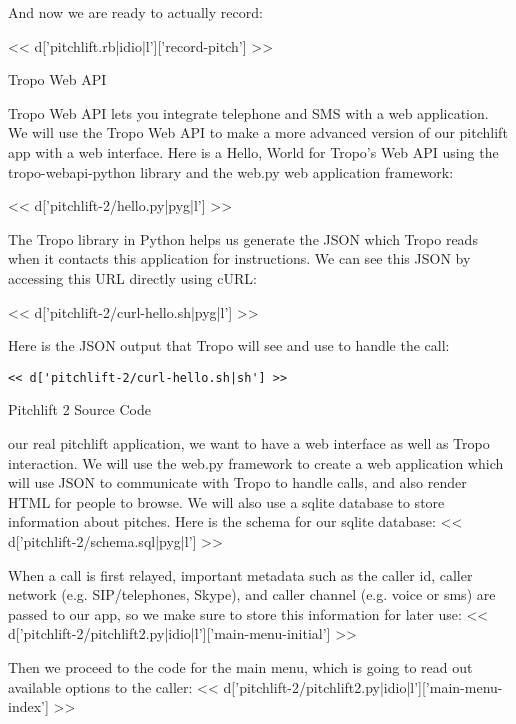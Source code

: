 \documentclass[custom, plainsections]{sciposter}
\begin{document}
\begin{multicols*}{2}
And now we are ready to actually record:

<< d['pitchlift.rb|idio|l']['record-pitch'] >>

\pagebreak

\large
Tropo Web API
\small

\vspace{5pt}

 Tropo Web API lets you integrate telephone and SMS with a web application. We will use the Tropo Web API to make a more advanced version of our pitchlift app with a web interface. Here is a Hello, World for Tropo's Web API using the tropo-webapi-python library and the web.py web application framework:

<< d['pitchlift-2/hello.py|pyg|l'] >>

The Tropo library in Python helps us generate the JSON which Tropo reads when it contacts this application for instructions. We can see this JSON by accessing this URL directly using cURL:

<< d['pitchlift-2/curl-hello.sh|pyg|l'] >>

Here is the JSON output that Tropo will see and use to handle the call:

\begin{Verbatim}
<< d['pitchlift-2/curl-hello.sh|sh'] >>
\end{Verbatim}

\vspace{10pt}

\large
Pitchlift 2 Source Code
\small

\label{sec:pitchlift-2}

\vspace{5pt}

 our real pitchlift application, we want to have a web interface as well as Tropo interaction. We will use the web.py framework to create a web application which will use JSON to communicate with Tropo to handle calls, and also render HTML for people to browse. We will also use a sqlite database to store information about pitches. Here is the schema for our sqlite database:
<< d['pitchlift-2/schema.sql|pyg|l'] >>

When a call is first relayed, important metadata such as the caller id, caller network (e.g. SIP/telephones, Skype), and caller channel (e.g. voice or sms) are passed to our app, so we make sure to store this information for later use:
<< d['pitchlift-2/pitchlift2.py|idio|l']['main-menu-initial'] >>

Then we proceed to the code for the main menu, which is going to read out available options to the caller:
<< d['pitchlift-2/pitchlift2.py|idio|l']['main-menu-index'] >>


\end{multicols*}
\end{document}
